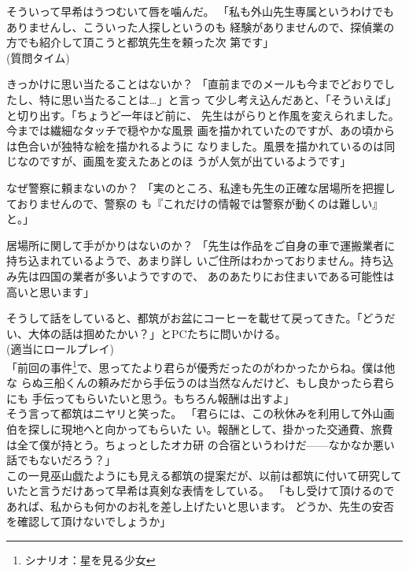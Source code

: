 \documentclass[a4paper,8pt,min]{jsarticle}
\begin{document}
そういって早希はうつむいて唇を噛んだ。
「私も外山先生専属というわけでもありませんし、こういった人探しというのも
経験がありませんので、探偵業の方でも紹介して頂こうと都筑先生を頼った次
第です」\\

(質問タイム)


\begin{topic}
 \item[きっかけに思い当たることはないか？]
 「直前までのメールも今までどおりでしたし、特に思い当たることは…」と言っ
 て少し考え込んだあと、「そういえば」と切り出す。「ちょうど一年ほど前に、
 先生はがらりと作風を変えられました。今までは繊細なタッチで穏やかな風景
 画を描かれていたのですが、あの頃からは色合いが独特な絵を描かれるように
 なりました。風景を描かれているのは同じなのですが、画風を変えたあとのほ
 うが人気が出ているようです」

\item[なぜ警察に頼まないのか？]
 「実のところ、私達も先生の正確な居場所を把握しておりませんので、警察の
 も『これだけの情報では警察が動くのは難しい』と。」

\item[居場所に関して手がかりはないのか？]
 「先生は作品をご自身の車で運搬業者に持ち込まれているようで、あまり詳し
 いご住所はわかっておりません。持ち込み先は四国の業者が多いようですので、
 あのあたりにお住まいである可能性は高いと思います」\\
 
\end{topic}
\newpage

そうして話をしていると、都筑がお盆にコーヒーを載せて戻ってきた。「どうだ
い、大体の話は掴めたかい？」とPCたちに問いかける。\\


(適当にロールプレイ)\\

「前回の事件\footnote{シナリオ：星を見る少女}で、思ってたより君らが優秀だったのがわかったからね。僕は他な
らぬ三船くんの頼みだから手伝うのは当然なんだけど、もし良かったら君らにも
手伝ってもらいたいと思う。もちろん報酬は出すよ」\\
そう言って都筑はニヤリと笑った。
「君らには、この秋休みを利用して外山画伯を探しに現地へと向かってもらいた
い。報酬として、掛かった交通費、旅費は全て僕が持とう。ちょっとしたオカ研
の合宿というわけだ------なかなか悪い話でもないだろう？」\\

この一見巫山戯たようにも見える都筑の提案だが、以前は都筑に付いて研究して
いたと言うだけあって早希は真剣な表情をしている。
「もし受けて頂けるのであれば、私からも何かのお礼を差し上げたいと思います。
どうか、先生の安否を確認して頂けないでしょうか」\\
\end{document}
